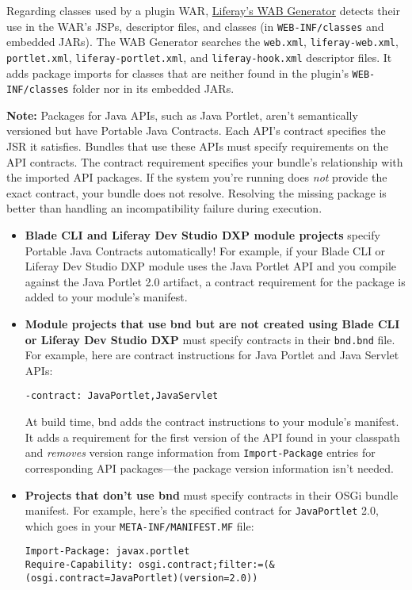Regarding classes used by a plugin WAR,
\href{/docs/7-2/customization/-/knowledge_base/c/deploying-wars-wab-generator}{Liferay's
WAB Generator} detects their use in the WAR's JSPs, descriptor files,
and classes (in \texttt{WEB-INF/classes} and embedded JARs). The WAB
Generator searches the \texttt{web.xml}, \texttt{liferay-web.xml},
\texttt{portlet.xml}, \texttt{liferay-portlet.xml}, and
\texttt{liferay-hook.xml} descriptor files. It adds package imports for
classes that are neither found in the plugin's \texttt{WEB-INF/classes}
folder nor in its embedded JARs.

\noindent\hrulefill

\textbf{Note:} Packages for Java APIs, such as Java Portlet, aren't
semantically versioned but have Portable Java Contracts. Each API's
contract specifies the JSR it satisfies. Bundles that use these APIs
must specify requirements on the API contracts. The contract requirement
specifies your bundle's relationship with the imported API packages. If
the system you're running does \emph{not} provide the exact contract,
your bundle does not resolve. Resolving the missing package is better
than handling an incompatibility failure during execution.

\begin{itemize}
\item
  \textbf{Blade CLI and Liferay Dev Studio DXP module projects} specify
  Portable Java Contracts automatically! For example, if your Blade CLI
  or Liferay Dev Studio DXP module uses the Java Portlet API and you
  compile against the Java Portlet 2.0 artifact, a contract requirement
  for the package is added to your module's manifest.
\item
  \textbf{Module projects that use bnd but are not created using Blade
  CLI or Liferay Dev Studio DXP} must specify contracts in their
  \texttt{bnd.bnd} file. For example, here are contract instructions for
  Java Portlet and Java Servlet APIs:

\begin{verbatim}
-contract: JavaPortlet,JavaServlet
\end{verbatim}

  At build time, bnd adds the contract instructions to your module's
  manifest. It adds a requirement for the first version of the API found
  in your classpath and \emph{removes} version range information from
  \texttt{Import-Package} entries for corresponding API packages---the
  package version information isn't needed.
\item
  \textbf{Projects that don't use bnd} must specify contracts in their
  OSGi bundle manifest. For example, here's the specified contract for
  \texttt{JavaPortlet} 2.0, which goes in your
  \texttt{META-INF/MANIFEST.MF} file:

\begin{verbatim}
Import-Package: javax.portlet
Require-Capability: osgi.contract;filter:=(&(osgi.contract=JavaPortlet)(version=2.0))
\end{verbatim}
\end{itemize}

